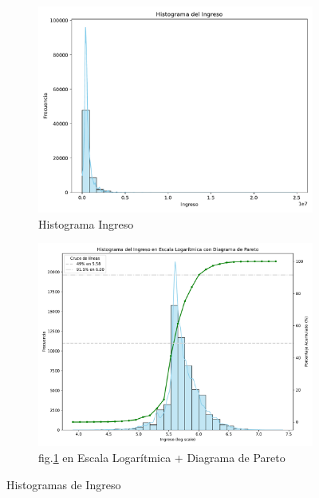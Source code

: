 \documentclass{article}
\begin{document}
	\begin{figure}[htbp]
		\centering
		\begin{subfigure}[b]{0.49\textwidth}
			\centering
			\includegraphics[width=1\textwidth]{../output/fig/HistoIngreso.pdf}
			\caption{\label{1a} Histograma Ingreso}
		\end{subfigure}
		\hfill
		\begin{subfigure}[b]{0.49\textwidth}
			\centering
			\includegraphics[width = 1\textwidth]{../output/fig/HistoIng_loglogPareto.pdf}
			\caption{\label{1b} fig.\ref{1a} en Escala Logarítmica + Diagrama de Pareto}
		\end{subfigure}
		\caption{Histogramas de Ingreso}
		\label{01fig}
	\end{figure}
	
\end{document}
